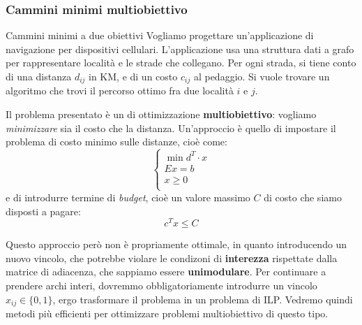 \documentclass[a4paper,11pt]{article}
\begin{document}
\subsubsection{Cammini minimi multiobiettivo}
\begin{problem}{Cammini minimi a due obiettivi}
	Vogliamo progettare un'applicazione di navigazione per dispositivi cellulari.
	L'applicazione usa una struttura dati a grafo per rappresentare località e le strade che collegano.
	Per ogni strada, si tiene conto di una distanza $d_{ij}$ in KM, e di un costo $c_{ij}$ al pedaggio.
	Si vuole trovare un algoritmo che trovi il percorso ottimo fra due località $i$ e $j$.
\end{problem}

Il problema presentato è un di ottimizzazione \textbf{multiobiettivo}: vogliamo \textit{minimizzare} sia il costo che la distanza.
Un'approccio è quello di impostare il problema di costo minimo sulle distanze, cioè come:
\[
	\begin{cases}
		\min d^T \cdot x \\ 
		Ex = b \\ 
		x \geq 0 \\ 
	\end{cases}
\]
e di introdurre termine di \textit{budget}, cioè un valore massimo $C$ di costo che siamo disposti a pagare:
$$
c^T x \leq C
$$

Questo approccio però non è propriamente ottimale, in quanto introducendo un nuovo vincolo, che potrebbe violare le condizoni di \textbf{interezza} rispettate dalla matrice di adiacenza, che sappiamo essere \textbf{unimodulare}.
Per continuare a prendere archi interi, dovremmo obbligatoriamente introdurre un vincolo $x_{ij} \in \{0, 1\}$, ergo trasformare il problema in un problema di ILP.
Vedremo quindi metodi più efficienti per ottimizzare problemi multiobiettivo di questo tipo.
\end{document}

